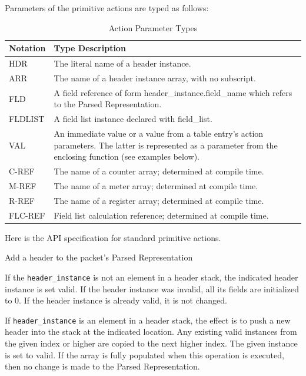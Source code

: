\documentclass[12pt]{article}
\begin{document}
Parameters of the primitive actions are typed as follows:

\begin{table}[H]
\begin{center}
\begin{tabular}{| l | p{} |} \hline
\textbf{Notation} &
\textbf{Type Description} \\ \hline
HDR &
The literal name of a header instance. \\ \hline
ARR &
The name of a header instance array, with no subscript. \\ \hline
FLD &
A field reference of form header_instance.field_name which refers to the Parsed Representation. \\ \hline
FLDLIST &
A field list instance declared with field_list. \\ \hline
VAL &
An immediate value or a value from a table entry's action parameters. 
The latter is represented as a parameter from the enclosing function (see examples below). \\ \hline
C-REF &
The name of a counter array; determined at compile time. \\ \hline
M-REF &
The name of a meter array; determined at compile time. \\ \hline
R-REF &
The name of a register array; determined at compile time. \\ \hline
FLC-REF &
Field list calculation reference; determined at compile time. \\ \hline
\end{tabular}
\end{center}
\caption{Action Parameter Types}
\label{tab:actionparamtypes}
\end{table}

Here is the API specification for standard primitive actions.


{ %
Add a header to the packet's Parsed Representation
}
{ %
}
{ %
If the \texttt{header_instance} is not an element in a header stack, the indicated 
header instance is set valid. If the header instance was invalid, all its 
fields are initialized to 0. If the header instance is already valid, it is 
not changed.

If \texttt{header_instance} is an element in a header stack, the effect is to push 
a new header into the stack at the indicated location. Any existing valid 
instances from the given index or higher are copied to the next higher index. 
The given instance is set to valid. If the array is fully populated when this 
operation is executed, then no change is made to the Parsed Representation.
}
\end{document}
